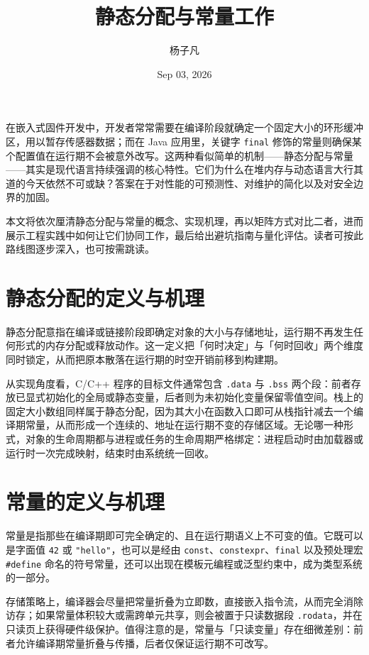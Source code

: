 \title{静态分配与常量工作}
\author{杨子凡}
\date{Sep 03, 2026}
\maketitle
在嵌入式固件开发中，开发者常常需要在编译阶段就确定一个固定大小的环形缓冲区，用以暂存传感器数据；而在 Java 应用里，关键字 \texttt{final} 修饰的常量则确保某个配置值在运行期不会被意外改写。这两种看似简单的机制——静态分配与常量——其实是现代语言持续强调的核心特性。它们为什么在堆内存与动态语言大行其道的今天依然不可或缺？答案在于对性能的可预测性、对维护的简化以及对安全边界的加固。\par
本文将依次厘清静态分配与常量的概念、实现机理，再以矩阵方式对比二者，进而展示工程实践中如何让它们协同工作，最后给出避坑指南与量化评估。读者可按此路线图逐步深入，也可按需跳读。\par
\chapter{静态分配的定义与机理}
静态分配意指在编译或链接阶段即确定对象的大小与存储地址，运行期不再发生任何形式的内存分配或释放动作。这一定义把「何时决定」与「何时回收」两个维度同时锁定，从而把原本散落在运行期的时空开销前移到构建期。\par
从实现角度看，C/C++ 程序的目标文件通常包含 \texttt{.data} 与 \texttt{.bss} 两个段：前者存放已显式初始化的全局或静态变量，后者则为未初始化变量保留零值空间。栈上的固定大小数组同样属于静态分配，因为其大小在函数入口即可从栈指针减去一个编译期常量，从而形成一个连续的、地址在运行期不变的存储区域。无论哪一种形式，对象的生命周期都与进程或任务的生命周期严格绑定：进程启动时由加载器或运行时一次完成映射，结束时由系统统一回收。\par
\chapter{常量的定义与机理}
常量是指那些在编译期即可完全确定的、且在运行期语义上不可变的值。它既可以是字面值 \texttt{42} 或 \texttt{"hello"}，也可以是经由 \texttt{const}、\texttt{constexpr}、\texttt{final} 以及预处理宏 \texttt{\#{}define} 命名的符号常量，还可以出现在模板元编程或泛型约束中，成为类型系统的一部分。\par
存储策略上，编译器会尽量把常量折叠为立即数，直接嵌入指令流，从而完全消除访存；如果常量体积较大或需跨单元共享，则会被置于只读数据段 \texttt{.rodata}，并在只读页上获得硬件级保护。值得注意的是，常量与「只读变量」存在细微差别：前者允许编译期常量折叠与传播，后者仅保证运行期不可改写。\par
